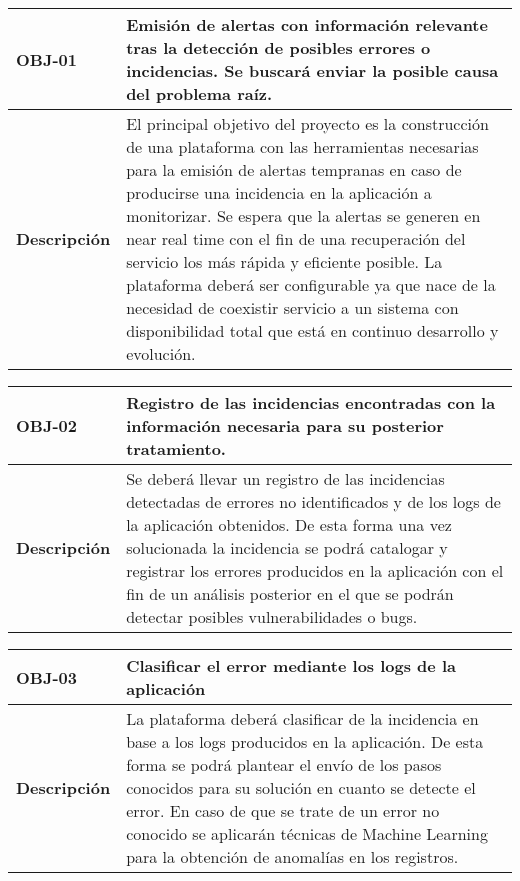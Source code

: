 \begin{table}[H]
\centering
\renewcommand{\arraystretch}{1.5}
\begin{tabular}{| p{2.5cm} | p{10cm} |}
\hline
\bf{OBJ-01} \cellcolor{Gray} & \textbf{Emisión de alertas con información relevante tras la detección de posibles errores o
incidencias. Se buscará enviar la posible causa del problema raíz.} \\
\hline
\bf{Descripción} \cellcolor{Gray} & 
El principal objetivo del proyecto es la construcción de una plataforma con las herramientas necesarias para la emisión de alertas tempranas en caso de producirse una incidencia en la aplicación a monitorizar. Se espera que la alertas se generen en near real time con el fin de una recuperación del servicio los más rápida y eficiente posible. La plataforma deberá ser configurable ya que nace de la necesidad de coexistir servicio a un sistema con disponibilidad total que está en continuo desarrollo y evolución.
\\
\hline
\end{tabular}
\end{table}


\begin{table}[H]
\centering
\renewcommand{\arraystretch}{1.5}
\begin{tabular}{| p{2.5cm} | p{10cm} |}
\hline

\bf{OBJ-02} \cellcolor{Gray} & \textbf{Registro de las incidencias encontradas con la información necesaria para su posterior
tratamiento.} \\
\hline
\bf{Descripción} \cellcolor{Gray} & Se deberá llevar un registro de las incidencias detectadas de errores no identificados y de los logs de la aplicación obtenidos. De esta forma una vez solucionada la incidencia se podrá catalogar y registrar los errores producidos en la aplicación con el fin de un análisis posterior en el que se podrán detectar posibles vulnerabilidades o bugs.
\\
\hline
\end{tabular}
\end{table}

\begin{table}[H]
\centering
\renewcommand{\arraystretch}{1.5}
\begin{tabular}{| p{2.5cm} | p{10cm} |}
\hline

\bf{OBJ-03} \cellcolor{Gray} & \textbf{Clasificar el error mediante los logs de la aplicación} \\
\hline
\bf{Descripción} \cellcolor{Gray} & La plataforma deberá clasificar de la incidencia en base a los logs producidos en la aplicación. De esta forma se podrá plantear el envío de los pasos conocidos para su solución en cuanto se detecte el error. En caso de que se trate de un error no conocido se aplicarán técnicas de Machine Learning para la obtención de anomalías en los registros.
\\
\hline
\end{tabular}
\end{table}


